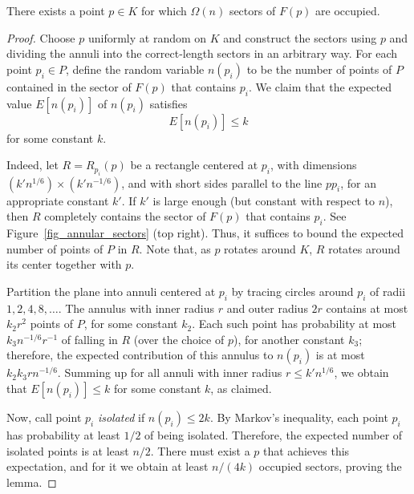 \documentclass[11pt]{article}
\begin{document}
\begin{lem}\label{lemma3.1} There exists a point $p\in K$
for which $\Omega(n)$ sectors of $F(p)$ are occupied.
\end{lem}

\begin{proof} Choose $p$ uniformly at random on $K$ and construct the
sectors using $p$ and dividing the annuli into the correct-length sectors in
an arbitrary way.
For each point $p_i\in P$, define the random variable $n(p_i)$
to be the number of points of $P$ contained in the sector of
$F(p)$ that contains $p_i$. We claim that the expected value
$E[n(p_i)]$ of $n(p_i)$ satisfies
\begin{equation*}
E[n(p_i)] \le k
\end{equation*}
for some constant $k$.

Indeed, let $R = R_{p_i}(p)$ be a rectangle centered at $p_i$,
with dimensions $(k' n^{1/6})\times(k' n^{-1/6})$, and with
short sides parallel to the line $pp_i$, for an appropriate
constant $k'$. If $k'$ is large enough (but constant with
respect to $n$), then $R$ completely contains the sector of
$F(p)$ that contains $p_i$. See Figure~\ref{fig_annular_sectors} (top right).
Thus, it suffices to bound the
expected number of points of $P$ in $R$. Note that, as $p$
rotates around $K$, $R$ rotates around its center together with
$p$.

Partition the plane into annuli centered at $p_i$ by tracing
circles around $p_i$ of radii $1,2,4,8,\ldots$. The annulus
with inner radius $r$ and outer radius $2r$ contains at most
$k_2 r^2$ points of $P$, for some constant $k_2$. Each such
point has probability at most $k_3 n^{-1/6}r^{-1}$ of falling
in $R$ (over the choice of $p$), for another constant $k_3$;
therefore, the expected contribution of this annulus to
$n(p_i)$ is at most $k_2k_3 r n^{-1/6}$. Summing up for all
annuli with inner radius $r \le k' n^{1/6}$, we obtain that
$E[n(p_i)] \le k$ for some constant $k$, as claimed.

Now, call point $p_i$ \emph{isolated} if $n(p_i) \le 2k$. By
Markov's inequality, each point $p_i$ has probability at least
$1/2$ of being isolated. Therefore, the expected number of
isolated points is at least $n/2$. There must exist a $p$ that
achieves this expectation, and for it we obtain at least
$n/(4k)$ occupied sectors, proving the lemma.
\end{proof}
\end{document}
